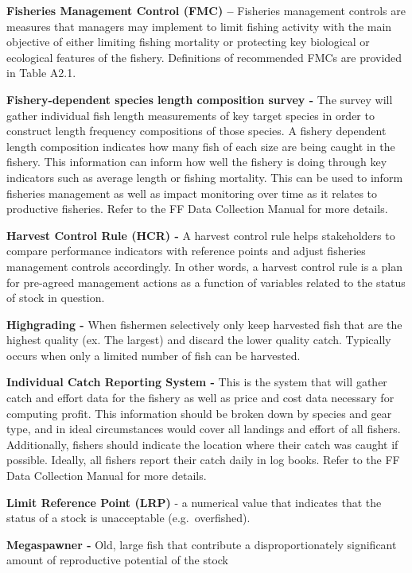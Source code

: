 \documentclass[]{book}
\begin{document}
\textbf{Fisheries Management Control (FMC) --} Fisheries management
controls are measures that managers may implement to limit fishing
activity with the main objective of either limiting fishing mortality or
protecting key biological or ecological features of the fishery.
Definitions of recommended FMCs are provided in Table A2.1.

\textbf{Fishery-dependent species length composition survey -} The
survey will gather individual fish length measurements of key target
species in order to construct length frequency compositions of those
species. A fishery dependent length composition indicates how many fish
of each size are being caught in the fishery. This information can
inform how well the fishery is doing through key indicators such as
average length or fishing mortality. This can be used to inform
fisheries management as well as impact monitoring over time as it
relates to productive fisheries. Refer to the FF Data Collection Manual
for more details.

\textbf{Harvest Control Rule (HCR) -} A harvest control rule helps
stakeholders to compare performance indicators with reference points and
adjust fisheries management controls accordingly. In other words, a
harvest control rule is a plan for pre-agreed management actions as a
function of variables related to the status of stock in question.

\textbf{Highgrading -} When fishermen selectively only keep harvested
fish that are the highest quality (ex. The largest) and discard the
lower quality catch. Typically occurs when only a limited number of fish
can be harvested.

\textbf{Individual Catch Reporting System -} This is the system that
will gather catch and effort data for the fishery as well as price and
cost data necessary for computing profit. This information should be
broken down by species and gear type, and in ideal circumstances would
cover all landings and effort of all fishers. Additionally, fishers
should indicate the location where their catch was caught if possible.
Ideally, all fishers report their catch daily in log books. Refer to the
FF Data Collection Manual for more details.

\textbf{Limit Reference Point (LRP)} - a numerical value that indicates
that the status of a stock is unacceptable (e.g.~overfished).

\textbf{Megaspawner -} Old, large fish that contribute a
disproportionately significant amount of reproductive potential of the
stock
\end{document}
